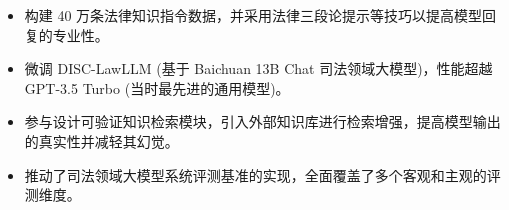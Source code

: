 


\begin{itemize}[nosep]
  \item 构建 40 万条法律知识指令数据，并采用法律三段论提示等技巧以提高模型回复的专业性。
  \item 微调 DISC-LawLLM (基于 Baichuan 13B Chat 司法领域大模型)，性能超越 GPT-3.5 Turbo (当时最先进的通用模型)。
  \item 参与设计可验证知识检索模块，引入外部知识库进行检索增强，提高模型输出的真实性并减轻其幻觉。
  \item 推动了司法领域大模型系统评测基准的实现，全面覆盖了多个客观和主观的评测维度。
\end{itemize}
